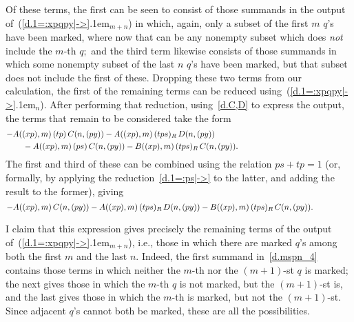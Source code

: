 \documentclass{amsart}
\begin{document}
Of these terms, the first can be seen to consist of those summands
in the output of~({{\setlength{\mathsurround}{0em}\ref{d.1=:xpqpy|->}\kern.1em$_{{m+n}}$}}) in which, again, only a subset
of the first $m$ $\!q\!$'s have been marked, where now that can be any
nonempty subset which does {\em not}
include the $\!m\!$-th $q;$ and the third
term likewise consists of those summands in which some nonempty subset
of the last $n$ $\!q\!$'s have been marked, but that
subset does not include the first of these.
Dropping these two terms from our calculation,
the first of the remaining terms can be reduced using~({{\setlength{\mathsurround}{0em}\ref{d.1=:xpqpy|->}\kern.1em$_{{n}}$}}).
After performing that reduction, using~\eqref{d.C,D}
to express the output, the terms that remain to be considered
take the form
\begin{equation}\begin{minipage}[c]{35pc}\label{d.mspn_3}
$- A((xp),m)\,(tp)\,C(n,(py))
- A((xp),m)\,(tps)_R\,D(n,(py))\\[.3em]
\hspace*{2em}- A((xp),m)\,(ps)\,C(n,(py))
- B((xp),m)\,(tps)_R\,C(n,(py)).$
\end{minipage}\end{equation}
The first and third of these can be combined
using the relation $ps+tp=1$ (or, formally, by applying
the reduction~\eqref{d.1=:ps|->} to the latter, and adding
the result to the former), giving
\begin{equation}\begin{minipage}[c]{35pc}\label{d.mspn_4}
$- A((xp),m)\,C(n,(py))
- A((xp),m)\,(tps)_R\,D(n,(py))
- B((xp),m)\,(tps)_R\,C(n,(py)).$
\end{minipage}\end{equation}

I claim that this expression gives precisely the remaining
terms of the output of~({{\setlength{\mathsurround}{0em}\ref{d.1=:xpqpy|->}\kern.1em$_{{m+n}}$}}), i.e., those in which
there are marked $\!q\!$'s among both the first $m$ and
the last $n.$
Indeed, the first summand in~\eqref{d.mspn_4} contains those
terms in which neither the $\!m\!$-th nor the $\!(m+1)\!$-st $q$
is marked; the next gives those in which the $\!m\!$-th $q$ is
not marked, but the $\!(m+1)\!$-st is, and the last
gives those in which the $\!m\!$-th is marked, but
not the $\!(m+1)\!$-st.
Since adjacent $\!q\!$'s cannot both be marked, these are
all the possibilities.
\end{document}
